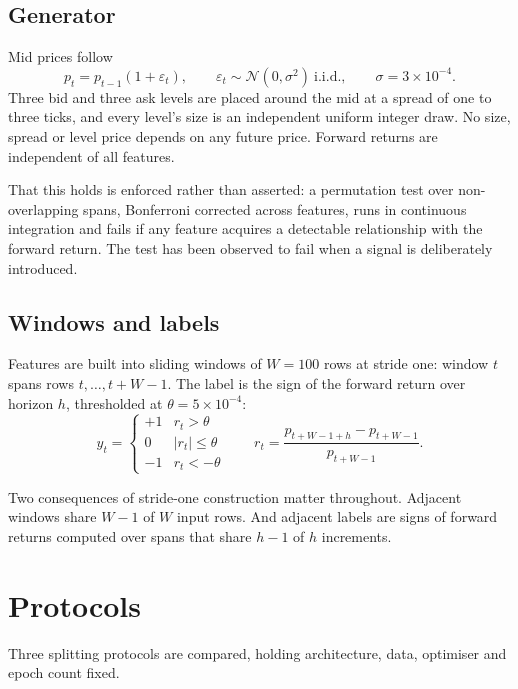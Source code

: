 \documentclass[11pt,a4paper]{article}
\begin{document}
\subsection{Generator}

Mid prices follow
\begin{equation}
p_t = p_{t-1}\left(1 + \varepsilon_t\right), \qquad
\varepsilon_t \sim \mathcal{N}(0, \sigma^2) \ \text{i.i.d.}, \qquad
\sigma = 3\times10^{-4}.
\end{equation}
Three bid and three ask levels are placed around the mid at a spread of one to
three ticks, and every level's size is an independent uniform integer draw. No
size, spread or level price depends on any future price. Forward returns are
independent of all features.

That this holds is enforced rather than asserted: a permutation test over
non-overlapping spans, Bonferroni corrected across features, runs in continuous
integration and fails if any feature acquires a detectable relationship with the
forward return. The test has been observed to fail when a signal is deliberately
introduced.

\subsection{Windows and labels}

Features are built into sliding windows of $W = 100$ rows at stride one:
window $t$ spans rows $t,\dots,t+W-1$. The label is the sign of the forward
return over horizon $h$, thresholded at $\theta = 5\times10^{-4}$:
\begin{equation}
y_t = \begin{cases}
+1 & r_t > \theta\\
0 & |r_t| \leq \theta\\
-1 & r_t < -\theta
\end{cases}
\qquad
r_t = \frac{p_{t+W-1+h} - p_{t+W-1}}{p_{t+W-1}} .
\end{equation}

Two consequences of stride-one construction matter throughout. Adjacent windows
share $W-1$ of $W$ input rows. And adjacent labels are signs of forward returns
computed over spans that share $h-1$ of $h$ increments.

\section{Protocols}

Three splitting protocols are compared, holding architecture, data, optimiser
and epoch count fixed.
\end{document}
